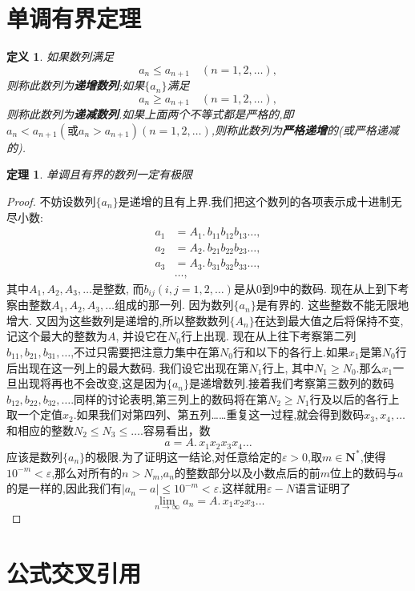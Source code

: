 \documentclass[UTF8,a4paper,twoside,zihao=-4]{ctexrep}
\theoremstyle{nonumberplain}
\newtheorem{proof}{证明}
\newtheorem{theorem}{定理}[chapter]
\newtheorem{definition}{定义}[chapter]
\newcommand{\nn}{\mathbf{N}^\ast}
\renewcommand{\leq}{\leqslant}
\renewcommand{\geq}{\geqslant}
\renewcommand{\epsilon}{\varepsilon}
\begin{document}
\section{单调有界定理}
\begin{definition}
如果数列满足
\[
a_n\leq a_{n+1}\quad(n=1,2,\dots),
\]
则称此数列为\textbf{递增数列};如果$\{a_n\}$满足
\[
a_n\geq a_{n+1}\quad(n=1,2,\dots),
\]
则称此数列为\textbf{递减数列}.如果上面两个不等式都是严格的,即$a_n<a_{n+1}(\mbox{或}a_n>a_{n+1})(n=1,2,\dots)$,则称此数列为\textbf{严格递增}的(或严格递减的).
\end{definition}
\begin{theorem}\label{T:DDYJ}
单调且有界的数列一定有极限
\end{theorem}
\begin{proof}
	不妨设数列$\{a_n\}$是递增的且有上界.我们把这个数列的各项表示成十进制无尽小数:
\[
\begin{aligned}
	a_1&=A_1.\,b_{11}b_{12}b_{13}\dots ,\\
	a_2&=A_2.\,b_{21}b_{22}b_{23}\dots ,\\
	a_3&=A_3.\,b_{31}b_{32}b_{33}\dots ,\\
	&\dots ,
\end{aligned}
\]
其中$A_1, A_2, A_3,\dots$是整数, 而$b_{ij}(i,j=1,2,\dots)$是从0到9中的数码. 现在从上到下考察由整数$A_1,A_2,A_3,\dots$组成的那一列. 因为数列$\{a_n\}$是有界的. 这些整数不能无限地增大. 又因为这些数列是递增的,所以整数数列$\{A_n\}$在达到最大值之后将保持不变, 记这个最大的整数为$A$, 并设它在$N_0$行上出现. 现在从上往下考察第二列$b_{11},b_{21},b_{31},\dots$,不过只需要把注意力集中在第$N_0$行和以下的各行上.如果$x_1$是第$N_0$行后出现在这一列上的最大数码. 我们设它出现在第$N_1$行上, 其中$N_1\geq N_0$.那么$x_1$一旦出现将再也不会改变,这是因为$\{a_n\}$是递增数列.接着我们考察第三数列的数码$b_{12},b_{22},b_{32},\dots$.同样的讨论表明,第三列上的数码将在第$N_2\geq N_1$行及以后的各行上取一个定值$x_2$.如果我们对第四列、第五列……重复这一过程,就会得到数码$x_3,x_4,\dots$和相应的整数$N_2\leq N_3\leq\dots$.容易看出，数
\[
a=A.\,x_1x_2x_3x_4\dots
\]
应该是数列$\{a_n\}$的极限.为了证明这一结论,对任意给定的$\epsilon>0$,取$m\in\nn$,使得$10^{-m}<\epsilon$,那么对所有的$n>N_m$,$a_n$的整数部分以及小数点后的前$m$位上的数码与$a$的是一样的,因此我们有$|a_n-a|\leq10^{-m}<\epsilon$.这样就用$\epsilon-N$语言证明了
\[
\lim_{n\to\infty}a_n=A.\,x_1x_2x_3\dots
\]
\end{proof}
\section{公式交叉引用}
\end{document}
